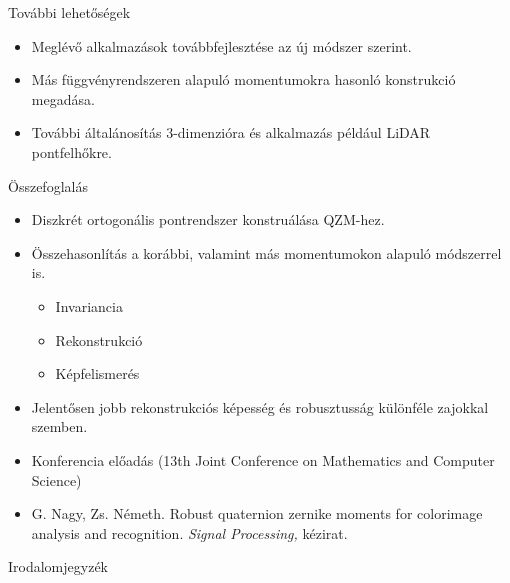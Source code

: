 \documentclass{beamer}
\begin{document}
\begin{frame}{További lehetőségek}
    \begin{itemize}
    \item Meglévő alkalmazások továbbfejlesztése az új módszer szerint.
    \item Más függvényrendszeren alapuló momentumokra hasonló konstrukció megadása.
    \item További általánosítás 3-dimenzióra és alkalmazás például LiDAR pontfelhőkre.
    \end{itemize}
\end{frame}

\begin{frame}{Összefoglalás}
    \vskip 5mm
    \begin{itemize}
    \item Diszkrét ortogonális pontrendszer konstruálása QZM-hez.
    \item Összehasonlítás a korábbi, valamint más momentumokon alapuló módszerrel is.
        \begin{itemize}
        \item Invariancia
        \item Rekonstrukció
        \item Képfelismerés
        \end{itemize}
    \item Jelentősen jobb rekonstrukciós képesség és robusztusság különféle zajokkal szemben.
    \item Konferencia előadás (13th Joint Conference on Mathematics and Computer Science)
    \item G. Nagy, Zs. Németh. \color[rgb]{.2,.2,.7}Robust quaternion zernike moments for colorimage analysis and recognition. \color{black}\textit{Signal Processing,} kézirat.
    \end{itemize}
\end{frame}

\begin{frame}{Irodalomjegyzék}
    \vskip 7mm
\nocite{macs}
\nocite{kezirat}
\begin{footnotesize}
{}

\end{footnotesize}
\end{frame}

\end{document}
